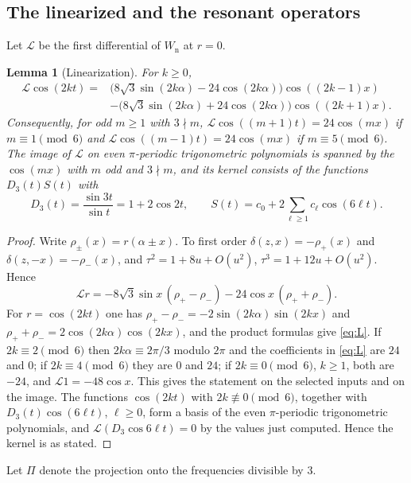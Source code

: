 \documentclass[11pt]{amsart}
\numberwithin{equation}{section}
\newtheorem{lemma}[theorem]{Lemma}
\theoremstyle{definition}
\theoremstyle{remark}
\newcommand{\Wn}{W_{\mathrm n}}
\newcommand{\Lin}{\mathcal L}
\begin{document}
\subsection{The linearized and the resonant operators}
Let $\Lin$ be the first differential of $\Wn$ at $r=0$.

\begin{lemma}[Linearization]\label{lem:lin}
For $k\ge0$,
\begin{equation}\label{eq:L}
\begin{aligned}
\Lin\cos(2kt)={}&\bigl(8\sqrt3\sin(2k\alpha)-24\cos(2k\alpha)\bigr)\cos((2k-1)x)\\
&-\bigl(8\sqrt3\sin(2k\alpha)+24\cos(2k\alpha)\bigr)\cos((2k+1)x).
\end{aligned}
\end{equation}
Consequently, for odd $m\ge1$ with $3\nmid m$, $\Lin\cos((m+1)t)=24\cos(mx)$ if $m\equiv1\pmod6$ and $\Lin\cos((m-1)t)=24\cos(mx)$ if $m\equiv5\pmod6$. The image of $\Lin$ on even $\pi$-periodic trigonometric polynomials is spanned by the $\cos(mx)$ with $m$ odd and $3\nmid m$, and its kernel consists of the functions $D_3(t)S(t)$ with
\begin{equation}\label{eq:kernel}
D_3(t)=\frac{\sin3t}{\sin t}=1+2\cos2t,\qquad S(t)=c_0+2\sum_{\ell\ge1}c_\ell\cos(6\ell t).
\end{equation}
\end{lemma}

\begin{proof}
Write $\rho_\pm(x)=r(\alpha\pm x)$. To first order $\delta(z,x)=-\rho_+(x)$ and $\delta(z,-x)=-\rho_-(x)$, and $\tau^2=1+8u+O(u^2)$, $\tau^3=1+12u+O(u^2)$. Hence
\[
\Lin r=-8\sqrt3\sin x\,(\rho_+-\rho_-)-24\cos x\,(\rho_++\rho_-).
\]
For $r=\cos(2kt)$ one has $\rho_+-\rho_-=-2\sin(2k\alpha)\sin(2kx)$ and $\rho_++\rho_-=2\cos(2k\alpha)\cos(2kx)$, and the product formulas give \eqref{eq:L}. If $2k\equiv2\pmod6$ then $2k\alpha\equiv2\pi/3$ modulo $2\pi$ and the coefficients in \eqref{eq:L} are $24$ and $0$; if $2k\equiv4\pmod6$ they are $0$ and $24$; if $2k\equiv0\pmod 6$, $k\ge1$, both are $-24$, and $\Lin1=-48\cos x$. This gives the statement on the selected inputs and on the image. The functions $\cos(2kt)$ with $2k\not\equiv0\pmod6$, together with $D_3(t)\cos(6\ell t)$, $\ell\ge0$, form a basis of the even $\pi$-periodic trigonometric polynomials, and $\Lin(D_3\cos6\ell t)=0$ by the values just computed. Hence the kernel is as stated.
\end{proof}

Let $\Pi$ denote the projection onto the frequencies divisible by $3$.
\end{document}
